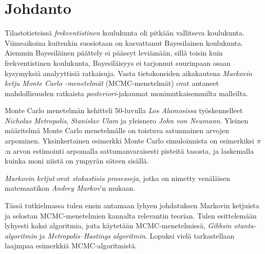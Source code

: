 \chapter{Johdanto}\label{johd}

Tilastotieteissä \textit{frekventistinen} koulukunta oli pitkään vallitseva koulukunta. Viimeaikoina kuitenkin suosiotaan on kasvattanut Bayesilainen koulukunta. Aiemmin Bayesiläinen päättely ei päässyt leviämään, sillä toisin kuin frekventistinen koulukunta, Bayesiläisyys ei tarjonnut suurinpaan osaan kysymyksiä analyyttisiä ratkaisuja. Vasta tietokoneiden aikakautena \textit{Markovin ketju Monte Carlo -menetelmät} (MCMC-menetelmät) ovat antaneet mahdollisuuden ratkaista \textit{posteriori}-jakaumat monimutkaisemmilta malleilta.

Monte Carlo menetelmän kehitteli 50-luvulla \textit{Los Alamosissa} työskennelleet \textit{Nicholas Metropolis}, \textit{Stanislav Ulam} ja yleisnero \textit{John von Neumann}. Yleinen määritelmä Monte Carlo menetelmälle on toistuva satunnainen arvojen arpominen. Yksinkertainen esimerkki Monte Carlo simuloinnista on esimerkiksi $\pi$:n arvon estimointi arpomalla sattumanvaraisesti pisteitä tasosta, ja laskemalla kuinka moni niistä on ympyrän säteen sisällä. 

\textit{Markovin ketjut} ovat \textit{stokastisia prosesseja}, jotka on nimetty venäläisen matemaatikon \textit{Andrey Markov}'n mukaan. 

Tässä tutkielmassa tulen ensin antamaan lyhyen johdatuksen Markovin ketjuista ja selostan MCMC-menetelmien kannalta relevantin teorian. Tulen esittelemään lyhyesti kaksi algoritmia, joita käytetään MCMC-menetelmissä, \textit{Gibbsin otanta-algoritmin} ja \textit{Metropolis–Hastings algoritmin}. Lopuksi vielä tarkastellaan laajmpaa esimerkkiä MCMC-algoritmistä.
